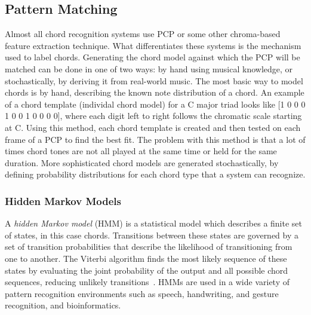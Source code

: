 \documentclass{sig-alternate}
\begin{document}
\subsection{Pattern Matching}

Almost all chord recognition systems use PCP or some other chroma-based feature extraction technique. What differentiates these systems is the mechanism used to label chords. Generating the chord model against which the PCP will be matched can be done in one of two ways: by hand using musical knowledge, or stochastically, by deriving it from real-world music. The most basic way to model chords is by hand, describing the known note distribution of a chord. An example of a chord template (individal chord model) for a C major triad looks like [1 0 0 0 1 0 0 1 0 0 0 0], where each digit left to right follows the chromatic scale starting at C. Using this method, each chord template is created and then tested on each frame of a PCP to find the best fit. The problem with this method is that a lot of times chord tones are not all played at the same time or held for the same duration.  More sophisticated chord models are generated stochastically, by defining probability distributions for each chord type that a system can recognize.  



\subsubsection{Hidden Markov Models}\label{main} 

A \textit{hidden Markov model} (HMM) is a statistical model which describes a finite set of states, in this case chords. Transitions between these states are governed by a set of transition probabilities that describe the likelihood of transitioning from one to another. The Viterbi algorithm finds the most likely sequence of these states by evaluating the joint probability of the output and all possible chord sequences, reducing unlikely transitions~\cite{TaeMin:2014}. HMMs are used in a wide variety of pattern recognition environments such as speech, handwriting, and gesture recognition, and bioinformatics. 

\end{document}
